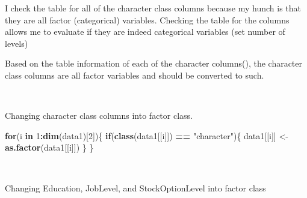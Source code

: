 \documentclass[
]{article}
\newenvironment{Shaded}{\begin{snugshade}}{\end{snugshade}}
\newcommand{\CommentTok}[1]{\textcolor[rgb]{0.56,0.35,0.01}{\textit{#1}}}
\newcommand{\ControlFlowTok}[1]{\textcolor[rgb]{0.13,0.29,0.53}{\textbf{#1}}}
\newcommand{\DecValTok}[1]{\textcolor[rgb]{0.00,0.00,0.81}{#1}}
\newcommand{\KeywordTok}[1]{\textcolor[rgb]{0.13,0.29,0.53}{\textbf{#1}}}
\newcommand{\NormalTok}[1]{#1}
\newcommand{\OperatorTok}[1]{\textcolor[rgb]{0.81,0.36,0.00}{\textbf{#1}}}
\newcommand{\StringTok}[1]{\textcolor[rgb]{0.31,0.60,0.02}{#1}}
\begin{document}
\begin{Shaded}
\end{Shaded}

I check the table for all of the character class columns because my
hunch is that they are all factor (categorical) variables. Checking the
table for the columns allows me to evaluate if they are indeed
categorical variables (set number of levels)

Based on the table information of each of the character columns(), the
character class columns are all factor variables and should be converted
to such.

~ ~

Changing character class columns into factor class.

\begin{Shaded}
\begin{Highlighting}[]
\ControlFlowTok{for}\NormalTok{(i }\ControlFlowTok{in} \DecValTok{1}\OperatorTok{:}\KeywordTok{dim}\NormalTok{(data1)[}\DecValTok{2}\NormalTok{])\{}
    \ControlFlowTok{if}\NormalTok{(}\KeywordTok{class}\NormalTok{(data1[[i]]) }\OperatorTok{==}\StringTok{ "character"}\NormalTok{)\{}
\NormalTok{        data1[[i]] <-}\StringTok{ }\KeywordTok{as.factor}\NormalTok{(data1[[i]]) }
\NormalTok{    \} }
\NormalTok{\}}
\end{Highlighting}
\end{Shaded}

~ ~

Changing Education, JobLevel, and StockOptionLevel into factor class
\end{document}
